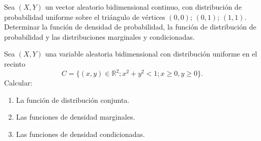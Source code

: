 \begin{ejercicio}
    Sea $(X,Y)$ un vector aleatorio bidimensional continuo, con distribución de probabilidad uniforme sobre el triángulo de vértices $(0,0)$; $(0,1)$; $(1,1)$. Determinar la función de densidad de probabilidad, la función de distribución de probabilidad y las distribuciones marginales y condicionadas.
\end{ejercicio}

\begin{ejercicio}
    Sea $(X,Y)$ una variable aleatoria bidimensional con distribución uniforme en el recinto
    \[
        C = \{(x, y) \in \mathbb{R}^2; x^2 + y^2 < 1; x \geq 0, y \geq 0\}.
    \]
    Calcular:
    \begin{enumerate}
        \item La función de distribución conjunta.
        \item Las funciones de densidad marginales.
        \item Las funciones de densidad condicionadas.
    \end{enumerate}
\end{ejercicio}